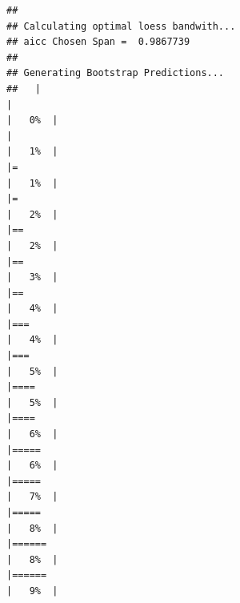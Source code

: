 \documentclass[
  ignorenonframetext,
]{beamer}
\newenvironment{Shaded}{\begin{snugshade}}{\end{snugshade}}
\newcommand{\FunctionTok}[1]{\textcolor[rgb]{0.00,0.00,0.00}{#1}}
\newcommand{\NormalTok}[1]{#1}
\newcommand{\OtherTok}[1]{\textcolor[rgb]{0.56,0.35,0.01}{#1}}
\newcommand{\SpecialCharTok}[1]{\textcolor[rgb]{0.00,0.00,0.00}{#1}}
\begin{document}
\begin{frame}[fragile]{}
\protect\hypertarget{section-16}{}
\tiny

\begin{Shaded}
\end{Shaded}

\begin{verbatim}
## 
## Calculating optimal loess bandwith...
## aicc Chosen Span =  0.9867739 
##  
## Generating Bootstrap Predictions... 
##   |                                                                              |                                                                      |   0%  |                                                                              |                                                                      |   1%  |                                                                              |=                                                                     |   1%  |                                                                              |=                                                                     |   2%  |                                                                              |==                                                                    |   2%  |                                                                              |==                                                                    |   3%  |                                                                              |==                                                                    |   4%  |                                                                              |===                                                                   |   4%  |                                                                              |===                                                                   |   5%  |                                                                              |====                                                                  |   5%  |                                                                              |====                                                                  |   6%  |                                                                              |=====                                                                 |   6%  |                                                                              |=====                                                                 |   7%  |                                                                              |=====                                                                 |   8%  |                                                                              |======                                                                |   8%  |                                                                              |======                                                                |   9%  |    
\end{verbatim}
\end{frame}
\end{document}

